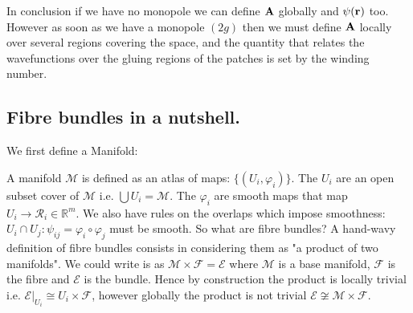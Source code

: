 \documentclass[10pt,a4paper]{book}
\newcommand\irregularcircle[2]{%
  \pgfextra {\pgfmathsetmacro\len{(#1)+rand*(#2)}}
  +(0:\len pt)
  \foreach \a in {10,20,...,350}{
    \pgfextra {\pgfmathsetmacro\len{(#1)+rand*(#2)}}
    -- +(\a:\len pt)
  } -- cycle
}
\begin{document}
In conclusion if we have no monopole we can define $\vb{A}$ globally and $\psi(\vb{r})$ too. However as soon as we have a monopole $(2g)$ then we must define $\vb{A}$ locally over several regions covering the space, and the quantity that relates the wavefunctions over the gluing regions of the patches is set by the winding number.

\subsection{Fibre bundles in a nutshell.}
\begin{figure}[h!]
\centering
{}
\end{figure}
We first define a Manifold:
\begin{figure}[h!]
\centering
{}
\end{figure}
A manifold $\mathcal{M}$ is defined as an atlas of maps: $\{(U_i, \varphi_i)\}$. The $U_i$ are an open subset cover of $\mathcal{M}$ i.e. $\bigcup U_i = \mathcal{M}$. The $\varphi_i$ are smooth maps that map $U_i \to \mathcal{R}_i \in \mathbb{R}^m$. We also have rules on the overlaps which impose smoothness: $U_i \cap U_j : \psi_{ij} = \varphi_i \circ \varphi_j$ must be smooth. So what are fibre bundles? A hand-wavy definition of fibre bundles consists in considering them as "a product of two manifolds". We could write is as $\mathcal{M} \times \mathcal{F} = \mathcal{E}$ where $\mathcal{M}$ is a base manifold, $\mathcal{F}$ is the fibre and $\mathcal{E}$ is the bundle. Hence by construction the product is locally trivial i.e. $\mathcal{E}\Big|_{U_i} \cong U_i \times \mathcal{F}$, however globally the product is not trivial $\mathcal{E} \not\cong \mathcal{M} \times \mathcal{F}$.
\begin{figure}[h!]
\centering
{}
\end{figure}
\end{document}
